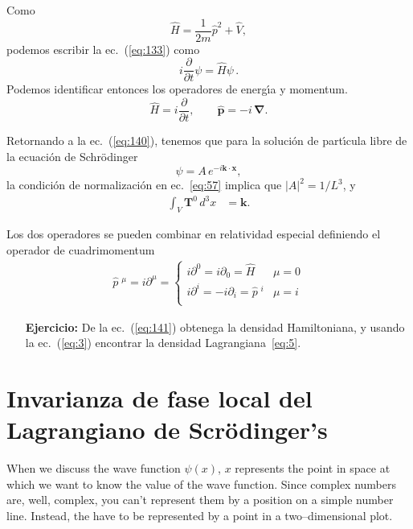 Como
\begin{equation}
  \widehat H=\frac{1}{2m}\hat p^2+\widehat V,
\end{equation}
podemos escribir la ec.~(\ref{eq:133}) como
\begin{equation}
  i\frac{\partial}{\partial t}\psi=\widehat H \psi\,.
\end{equation}
Podemos identificar entonces los operadores de energ\'\i a y momentum.
\begin{equation}
  \label{eq:151}
  \widehat H=i\frac{\partial}{\partial t},\qquad \hat{\mathbf{p}}=-i\,\boldsymbol{\nabla}.
\end{equation}

Retornando a la ec.~(\ref{eq:140}), tenemos que para la soluci\'on de part\'\i cula libre de la ecuaci\'on de Schr\"odinger 
\begin{equation}
  \psi=A\,e^{-i\mathbf{k}\cdot\mathbf{x}},
\end{equation}
la condici\'on de normalizaci\'on en ec.~\eqref{eq:57} implica que $|A|^2=1/L^3$, y
\begin{align}
  \int_V \mathbf{T}^0\, d^3x&=\mathbf{k}.
\end{align}

Los dos operadores se pueden combinar en relatividad especial definiendo el operador de cuadrimomentum
\begin{align}
  \widehat{p}\;^{\mu}=i\partial^{\mu}=
  \begin{cases}
    i\partial^0=i\partial_0=\widehat{H} & \mu=0\\
    i\partial^i=-i\partial_i=\widehat{p}\;^{i} & \mu=i\\
  \end{cases}
\end{align}



\begin{itemize}
\item[\textbf{Ejercicio:}]  De la ec.~(\ref{eq:141}) obtenega la densidad Hamiltoniana, y usando la ec.~(\ref{eq:3}) encontrar la densidad Lagrangiana~\eqref{eq:5}.
\end{itemize}


\section{Invarianza de fase local del Lagrangiano de  Scrödinger's}


When we discuss the wave function $\psi(x)$, $x$ represents the point in space at which we want to know the value of the wave function. Since complex numbers are, well, complex, you can't represent them by a position on a simple number line. Instead, the have to be represented by a point in a two--dimensional plot. 

